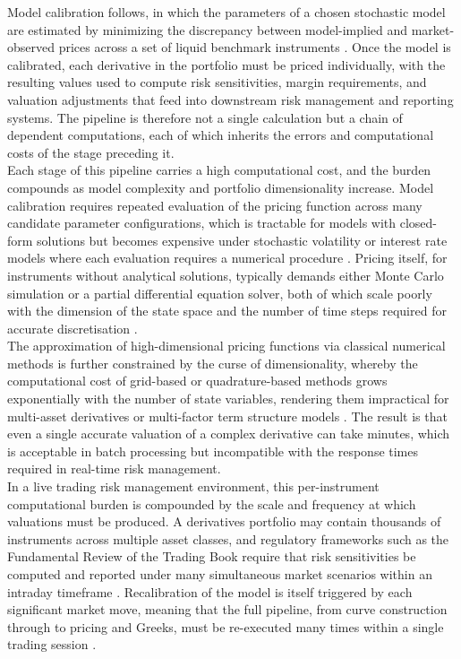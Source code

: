     \noindent
    Model calibration follows, in which the parameters of a chosen stochastic model are estimated by minimizing the discrepancy between model-implied and market-observed prices across a set of liquid benchmark instruments \cite{chang2024stochastic, choi2023calibrate}. Once the model is calibrated, each derivative in the portfolio must be priced individually, with the resulting values used to compute risk sensitivities, margin requirements, and valuation adjustments that feed into downstream risk management and reporting systems. The pipeline is therefore not a single calculation but a chain of dependent computations, each of which inherits the errors and computational costs of the stage preceding it. \\

    \noindent
    Each stage of this pipeline carries a high computational cost, and the burden compounds as model complexity and portfolio dimensionality increase. Model calibration requires repeated evaluation of the pricing function across many candidate parameter configurations, which is tractable for models with closed-form solutions but becomes expensive under stochastic volatility or interest rate models where each evaluation requires a numerical procedure \cite{horvath2020deeplearning}.  Pricing itself, for instruments without analytical solutions, typically demands either Monte Carlo simulation or a partial differential equation solver, both of which scale poorly with the
    dimension of the state space and the number of time steps required for accurate discretisation \cite{hutzenthaler2020overcoming, elbrachter2021dnn}.  \\

    \noindent
    The approximation of high-dimensional pricing functions via classical numerical methods is further constrained by the curse of dimensionality, whereby the computational cost of grid-based or quadrature-based methods grows exponentially with the number of state variables, rendering them impractical for multi-asset derivatives or multi-factor term structure models \cite{hutzenthaler2020overcoming}. The result is that even a single accurate valuation of a complex derivative can take minutes, which is acceptable in batch processing but incompatible with the response times required in real-time risk management.\\

    \noindent
    In a live trading risk management environment, this per-instrument computational burden is compounded by the scale and frequency at which valuations must be produced. A derivatives portfolio may contain thousands of instruments across multiple asset classes, and regulatory frameworks such as the Fundamental Review of the Trading Book require that risk sensitivities be computed and reported under many simultaneous market scenarios within an intraday timeframe \cite{despiegeleer2018machine}. Recalibration of the model is itself triggered by each significant market move, meaning that the full pipeline, from curve construction through to pricing and Greeks, must be re-executed many times within a single trading session \cite{anderson2023accelerated}. \\

